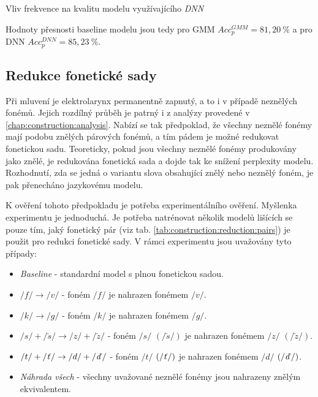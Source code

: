 \begin{table}[htpb]
  \centering
  \def\arraystretch{1.5}
  \caption{Vliv frekvence na kvalitu modelu využívajícího \textit{DNN} }
  \label{tab:construction:experiment:dnn}
\end{table}

Hodnoty přesnosti baseline modelu jsou tedy pro GMM $Acc_{p}^{GMM} = 81,20\ \%$ a pro DNN $Acc_{p}^{DNN} = 85,23\ \%$.

\subsection{Redukce fonetické sady}
\label{chap:construction:results:reduction}

Při mluvení je elektrolarynx permanentně zapnutý, a to i v případě neznělých fonémů. Jejich rozdílný průběh je patrný i z analýzy provedené v \ref{chap:construction:analysis}. Nabízí se tak předpoklad, že všechny neznělé fonémy mají podobu znělých párových fonémů, a tím pádem je možné redukovat fonetickou sadu. Teoreticky, pokud jsou všechny neznělé fonémy produkovány jako znělé, je redukována fonetická sada a dojde tak ke snížení perplexity modelu. Rozhodnutí, zda se jedná o variantu slova obsahující znělý nebo neznělý foném, je pak přenecháno jazykovému modelu.

K ověření tohoto předpokladu je potřeba experimentálního ověření. Myšlenka experimentu je jednoduchá. Je potřeba natrénovat několik modelů lišících se pouze tím, jaký fonetický pár (viz tab. \ref{tab:construction:reduction:pairs}) je použit pro redukci fonetické sady. V rámci experimentu jsou uvažovány tyto případy:

\begin{itemize}
  \item \textit{Baseline} - standardní model s plnou fonetickou sadou.
  \item $/f/ \rightarrow /v/$ - foném $/f/$ je nahrazen fonémem $/v/$.
  \item $/k/ \rightarrow /g/$ - foném $/k/$ je nahrazen fonémem $/g/$.
  \item $/s/+/\check{s}/ \rightarrow /z/+/\check{z}/$ - foném $/s/$ $\left(/\check{s}/\right)$ je nahrazen fonémem $/z/$ $\left(/\check{z}/\right)$.
  \item $/t/+/\text{\textit{ť}}/ \rightarrow /d/+/\text{\textit{ď}}/$ - foném $/t/$ $\left(/\text{\textit{ť}}/\right)$ je nahrazen fonémem $/d/$ $\left(/\text{\textit{ď}}/\right)$.
  \item \textit{Náhrada všech} - všechny uvažované neznělé fonémy jsou nahrazeny znělým ekvivalentem.
\end{itemize}

